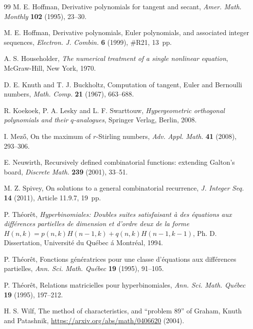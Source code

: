 \documentclass[10pt, a4paper, leqno]{amsart}
\numberwithin{equation}{section}
\theoremstyle{plain}
\theoremstyle{remark}
\begin{document}
\begin{thebibliography}{99}
M. E. Hoffman,
Derivative polynomials for tangent and secant,
\textit{Amer. Math. Monthly} \textbf{102} (1995), 23--30.

M. E. Hoffman,
Derivative polynomials, Euler polynomials, and associated integer sequences,
\textit{Electron. J. Combin.} \textbf{6} (1999), \#R21, 13~pp.

A. S. Householder,
\textit{The numerical treatment of a single nonlinear equation},
McGraw-Hill, New York, 1970.

D. E. Knuth and T. J. Buckholtz,
Computation of tangent, Euler and Bernoulli numbers,
\textit{Math. Comp.} \textbf{21} (1967), 663--688.

R. Koekoek, P. A. Lesky and L. F. Swarttouw,
\textit{Hypergeometric orthogonal polynomials and their $q$-analogues},
Springer Verlag, Berlin, 2008.

I. Mez\H{o},
{On the maximum of $r$-Stirling numbers},
\textit{Adv. Appl. Math.}
\textbf{41} (2008), 293--306.

E. Neuwirth,
Recursively defined combinatorial functions: extending Galton's board,
\textit{Discrete Math.} \textbf{239} (2001), 33--51.

M. Z. Spivey,
On solutions to a general combinatorial recurrence,
\textit{J. Integer Seq.} \textbf{14} (2011), Article 11.9.7, 19~pp.

P. Th\'eor\^et,
\textit{Hyperbinomiales: Doubles suites satisfaisant \`a des \'equations aux
diff\'erences partielles de dimension et d'ordre deux de la forme
$H(n, k) = p(n, k)H(n - 1, k) + q(n, k)H(n - 1, k - 1)$},
Ph. D. Dissertation, Universit\'e du Qu\'ebec \'a Montr\'eal, 1994.

P. Th\'eor\^et,
Fonctions g\'en\'eratrices pour une classe d'\'equations aux diff\'erences partielles,
\textit{Ann. Sci. Math. Qu\'ebec} \textbf{19} (1995), 91--105.

P. Th\'eor\^et,
Relations matricielles pour hyperbinomiales,
\textit{Ann. Sci. Math. Qu\'ebec} \textbf{19} (1995), 197--212.

H. S. Wilf,
The method of characteristics, and ``problem 89'' of Graham, Knuth and Patashnik,
\url{https://arxiv.org/abs/math/0406620} (2004).

\end{thebibliography}

\end{document}
